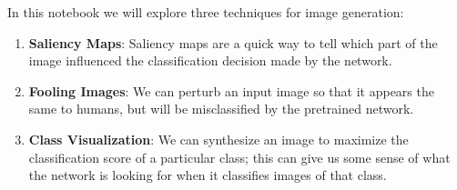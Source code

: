 \documentclass[]{book}
\providecommand{\tightlist}{%
  \setlength{\itemsep}{0pt}\setlength{\parskip}{0pt}}
\theoremstyle{definition}
\theoremstyle{definition}
\theoremstyle{definition}
\theoremstyle{remark}
\begin{document}
In this notebook we will explore three techniques for image generation:

\begin{enumerate}
\def\labelenumi{\arabic{enumi}.}
\tightlist
\item
  \textbf{Saliency Maps}: Saliency maps are a quick way to tell which
  part of the image influenced the classification decision made by the
  network.
\item
  \textbf{Fooling Images}: We can perturb an input image so that it
  appears the same to humans, but will be misclassified by the
  pretrained network.
\item
  \textbf{Class Visualization}: We can synthesize an image to maximize
  the classification score of a particular class; this can give us some
  sense of what the network is looking for when it classifies images of
  that class.
\end{enumerate}
\end{document}
